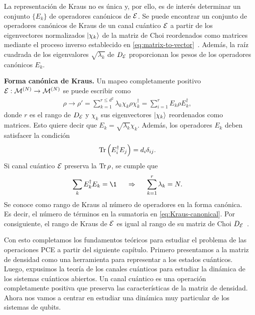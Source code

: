 La representación de Kraus no es única y, por ello, es de interés
determinar un conjunto $\{E_k\}$ de operadores canónicos de $\mathcal{E}$.
Se puede encontrar un conjunto de operadores canónicos de Kraus de 
un canal cuántico $\mathcal{E}$ a partir de los eigenvectores normalizados 
$\ket{\chi_k}$ de la matriz de Choi reordenados como matrices 
mediante el proceso inverso
establecido en \eqref{eq:matrix-to-vector}~\cite{bengtsson_zyczkowski_2017}.
Además, la raíz cuadrada de los eigenvalores $\sqrt{\lambda_k}$ de 
$D_{\mathcal{E}}$ proporcionan los pesos de los operadores canónicos $E_k$.

\textbf{Forma canónica de Kraus.} Un mapeo completamente 
positivo $\mathcal{E}:\mathcal{M}^{(N)}\to\mathcal{M}^{(N)}$ se
puede escribir como
\begin{align}
\rho \longrightarrow \rho' = 
\sum_{k=1}^{r\leq d^2}\lambda_k\chi_k\rho\chi_k^{\dagger}
= \sum_{i=1}^rE_k\rho E_k^{\dagger},
\label{eq:Kraus-canonical}
\end{align}
donde $r$ es el rango de $D_{\mathcal{E}}$ y $\chi_k$ sus eigenvectores
$\ket{\chi_k}$ reordenados como matrices. Esto quiere decir que 
$E_k=\sqrt{\lambda_k}\chi_k$. Además, los 
operadores $E_k$ deben satisfacer la condición
\begin{align}
  \Tr\qty(E_i^{\dagger}E_j)=d_i\delta_{ij}.
  \label{eq:Tr-Kraus-canonical}
\end{align}
Si canal cuántico $\mathcal{E}$ preserva la $\Tr \rho$, se cumple que
\begin{align}
  \sum_kE_k^{\dagger}E_k=\1
  \hspace{0.5cm}\Rightarrow\hspace{0.5cm}
  \sum_{k=1}^r\lambda_k=N .
  \label{eq:completeness-Kraus-canonical}
\end{align}
Se conoce como rango de Kraus al número de operadores 
en la forma canónica. Es decir, el número de términos en la sumatoria
en \eqref{eq:Kraus-canonical}. Por consiguiente, el rango de 
Kraus de $\mathcal{E}$ es igual al rango de su matriz de Choi 
$D_{\mathcal{E}}$~\cite{bengtsson_zyczkowski_2017}.

Con esto completamos los fundamentos teóricos para estudiar 
el problema de las operaciones PCE a partir del siguiente capítulo. 
Primero presentamos a la matriz de densidad como una herramienta 
para representar a los estados cuánticos. Luego, expusimos la teoría 
de los canales cuánticos para estudiar la dinámica de los sistemas 
cuánticos abiertos. Un canal cuántico es una operación
completamente positiva que preserva las características de la 
matriz de densidad. Ahora nos vamos a centrar en estudiar una 
dinámica muy particular de los sistemas de qubits.

